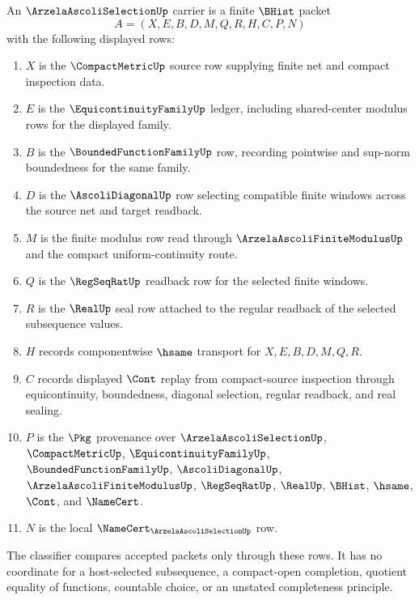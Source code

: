 \begin{definition}
\label{def:arzela-ascoli-selection-carrier}
An $\ArzelaAscoliSelectionUp$ carrier is a finite $\BHist$ packet
$$
A=(X,E,B,D,M,Q,R,H,C,P,N)
$$
with the following displayed rows:
\begin{enumerate}
\item $X$ is the $\CompactMetricUp$ source row supplying finite net and compact inspection data.
\item $E$ is the $\EquicontinuityFamilyUp$ ledger, including shared-center modulus rows for the displayed family.
\item $B$ is the $\BoundedFunctionFamilyUp$ row, recording pointwise and sup-norm boundedness for the same family.
\item $D$ is the $\AscoliDiagonalUp$ row selecting compatible finite windows across the source net and target readback.
\item $M$ is the finite modulus row read through $\ArzelaAscoliFiniteModulusUp$ and the compact uniform-continuity route.
\item $Q$ is the $\RegSeqRatUp$ readback row for the selected finite windows.
\item $R$ is the $\RealUp$ seal row attached to the regular readback of the selected subsequence values.
\item $H$ records componentwise $\hsame$ transport for $X,E,B,D,M,Q,R$.
\item $C$ records displayed $\Cont$ replay from compact-source inspection through equicontinuity, boundedness, diagonal selection, regular readback, and real sealing.
\item $P$ is the $\Pkg$ provenance over $\ArzelaAscoliSelectionUp$, $\CompactMetricUp$, $\EquicontinuityFamilyUp$, $\BoundedFunctionFamilyUp$, $\AscoliDiagonalUp$, $\ArzelaAscoliFiniteModulusUp$, $\RegSeqRatUp$, $\RealUp$, $\BHist$, $\hsame$, $\Cont$, and $\NameCert$.
\item $N$ is the local $\NameCert_{\ArzelaAscoliSelectionUp}$ row.
\end{enumerate}
The classifier compares accepted packets only through these rows. It has no coordinate for a host-selected subsequence, a compact-open completion, quotient equality of functions, countable choice, or an unstated completeness principle.
\end{definition}

